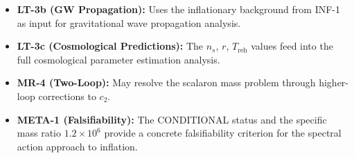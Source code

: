 \documentclass[11pt,a4paper]{article}
\theoremstyle{plain}
\theoremstyle{definition}
\begin{document}
\begin{itemize}[nosep]
  \item \textbf{LT-3b (GW Propagation):}
    Uses the inflationary background from INF-1 as input for
    gravitational wave propagation analysis.
  \item \textbf{LT-3c (Cosmological Predictions):}
    The $n_s$, $r$, $T_{\mathrm{reh}}$ values feed into the full
    cosmological parameter estimation analysis.
  \item \textbf{MR-4 (Two-Loop):}
    May resolve the scalaron mass problem through higher-loop corrections
    to $c_2$.
  \item \textbf{META-1 (Falsifiability):}
    The CONDITIONAL status and the specific mass ratio $1.2 \times 10^6$
    provide a concrete falsifiability criterion for the spectral action
    approach to inflation.
\end{itemize}
\end{document}
